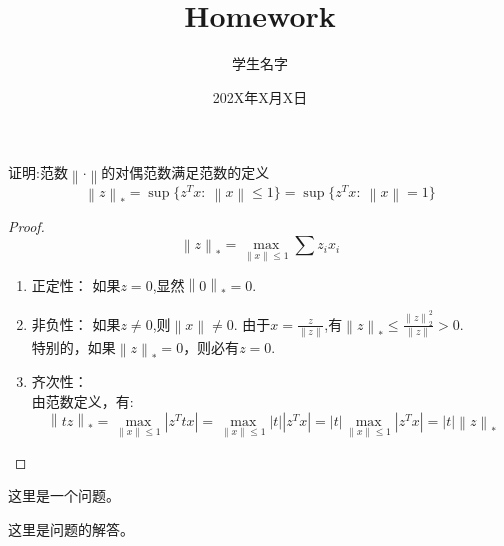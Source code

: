 \documentclass[12pt,cn]{homework}
\title{Homework} %
\author{学生名字} %
\date{202X年X月X日}
\institute{上海师范大学数理学院} %
\newcommand{\norm}[1]{\left\lVert#1\right\rVert}
\begin{document}
\maketitle %




\begin{problem}
证明:范数$\norm{\cdot}$的对偶范数满足范数的定义
	\begin{equation*}
	    \norm{z}_*=\sup\{z^Tx:\ \norm{x}\leq1\}=\sup\{z^Tx:\ \norm{x}=1\}
	\end{equation*}
\end{problem}
\begin{proof}
\begin{equation*}
        \norm{z}_*=\max_{\norm{x}\leq 1}\sum{z_ix_i}
    \end{equation*}
    \begin{enumerate}
    \item 正定性：
    如果$z=0$,显然$\norm{0}_*=0$.
    \item 非负性：
    如果$z\neq 0$,则$\norm{x}\neq 0$. 由于$x=\frac{z}{\norm{z}}$,有$\norm{z}_*\leq \frac{\norm{z}^2_2}{\norm{z}}>0$.\\
    特别的，如果$\norm{z}_*=0$，则必有$z=0$.
    \item 齐次性：\\
    由范数定义，有:
    \begin{equation*}
        \norm{tz}_*=\max_{\norm{x}\leq 1} | z^Ttx|=\max_{\norm{x}\leq 1}|t||z^Tx |=|t| \max_{\norm{x}\leq 1} | z^Tx |=|t|\norm{z}_*
    \end{equation*}
    \end{enumerate}
\end{proof}



\begin{problem}
	这里是一个问题。
\end{problem}
\begin{solution}
这里是问题的解答。
\end{solution}
\end{document}
